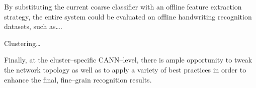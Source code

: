 \documentclass[10pt,conference,a4paper]{IEEEtran}
\begin{document}
	By substituting the current coarse classifier with an offline feature extraction strategy, the entire system could
	be evaluated on offline handwriting recognition datasets, such as\ldots. 

	Clustering\ldots

	Finally, at the cluster--specific CANN--level, there is ample opportunity to tweak the network topology as well as
	to apply a variety of best practices \cite{simard2003best} in order to enhance the final, fine--grain recognition results.



	
\end{document}
